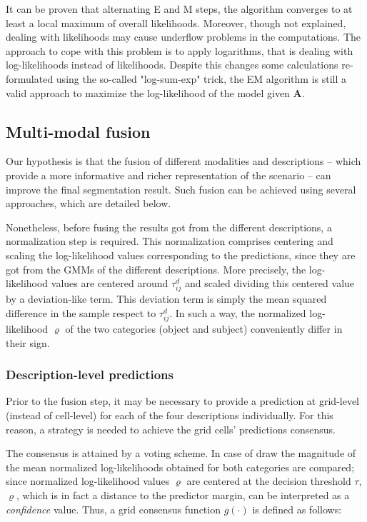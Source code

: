 \documentclass[10pt,twocolumn,letterpaper]{article}
\begin{document}
It can be proven that alternating E and M steps, the algorithm converges to at least a local maximum of overall likelihoods. Moreover, though not explained, dealing with likelihoods may cause underflow problems in the computations. The approach to cope with this problem is to apply logarithms, that is dealing with log-likelihoods instead of likelihoods. Despite this changes some calculations re-formulated using the so-called "log-sum-exp" trick, the EM algorithm is still a valid approach to maximize the log-likelihood of the model given $\mathbf{A}$.

\subsection{Multi-modal fusion} 
\label{ssec:fusion}

Our hypothesis is that the fusion of different modalities and descriptions -- which provide a more informative and richer representation of the scenario -- can improve the final segmentation result. Such fusion can be achieved using several approaches, which are detailed below.
 
Nonetheless, before fusing the results got from the different descriptions, a normalization step is required. This normalization comprises centering and scaling the log-likelihood values corresponding to the predictions, since they are got from the GMMs of the different descriptions. More precisely, the log-likelihood values are centered around $\tau_{ij}^{d}$ and scaled dividing this centered value by a deviation-like term. This deviation term is simply the mean squared difference in the sample respect to $\tau_{ij}^{d}$. In such a way, the normalized log-likelihood $\varrho$ of the two categories (object and subject) conveniently differ in their sign.

\subsubsection{Description-level predictions}
\label{sssec:descriptionlevelpredictions}

Prior to the fusion step, it may be necessary to provide a prediction at grid-level (instead of cell-level) for each of the four descriptions individually. For this reason, a strategy is needed to achieve the grid cells' predictions consensus. 

The consensus is attained by a voting scheme. In case of draw the magnitude of the mean normalized log-likelihoods obtained for both categories are compared; since normalized log-likelihood values $\varrho$ are centered at the decision threshold $\tau$, $\varrho$, which is in fact a distance to the predictor margin, can be interpreted as a \textit{confidence} value. Thus, a grid consensus function $g(\cdot)$ is defined as follows:
\end{document}
